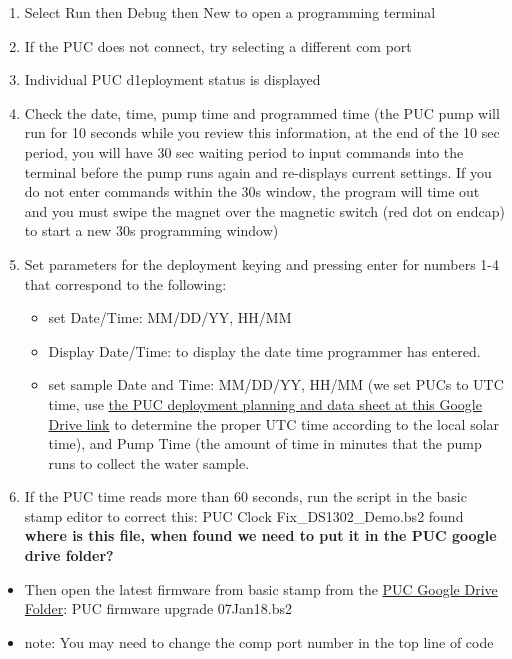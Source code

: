 \documentclass[
]{book}
\providecommand{\tightlist}{%
  \setlength{\itemsep}{0pt}\setlength{\parskip}{0pt}}
\begin{document}
\begin{enumerate}
\def\labelenumi{\arabic{enumi}.}
\item
  Select Run then Debug then New to open a programming terminal
\item
  If the PUC does not connect, try selecting a different com port
\item
  Individual PUC d1eployment status is displayed
\item
  Check the date, time, pump time and programmed time (the PUC pump will run for 10 seconds while you review this information, at the end of the 10 sec period, you will have 30 sec waiting period to input commands into the terminal before the pump runs again and re-displays current settings. If you do not enter commands within the 30s window, the program will time out and you must swipe the magnet over the magnetic switch (red dot on endcap) to start a new 30s programming window)
\item
  Set parameters for the deployment keying and pressing enter for numbers 1-4 that correspond to the following:

  \begin{itemize}
  \tightlist
  \item
    set Date/Time: MM/DD/YY, HH/MM
  \item
    Display Date/Time: to display the date time programmer has entered.
  \item
    set sample Date and Time: MM/DD/YY, HH/MM (we set PUCs to UTC time, use \href{https://drive.google.com/drive/folders/1aprNsz_a0cfscmCBz0DjbCuvCFerOfaw}{the PUC deployment planning and data sheet at this Google Drive link} to determine the proper UTC time according to the local solar time), and Pump Time (the amount of time in minutes that the pump runs to collect the water sample.
  \end{itemize}
\item
  If the PUC time reads more than 60 seconds, run the script in the basic stamp editor to correct this: PUC Clock Fix\_DS1302\_Demo.bs2 found \textbf{where is this file, when found we need to put it in the PUC google drive folder?}
\end{enumerate}

\begin{itemize}
\tightlist
\item
  Then open the latest firmware from basic stamp from the \href{https://drive.google.com/drive/folders/1X6fAG4OIDs66Ji5xzYsX8JySqhkSs5k-}{PUC Google Drive Folder}: PUC firmware upgrade 07Jan18.bs2
\item
  note: You may need to change the comp port number in the top line of code
\end{itemize}
\end{document}
